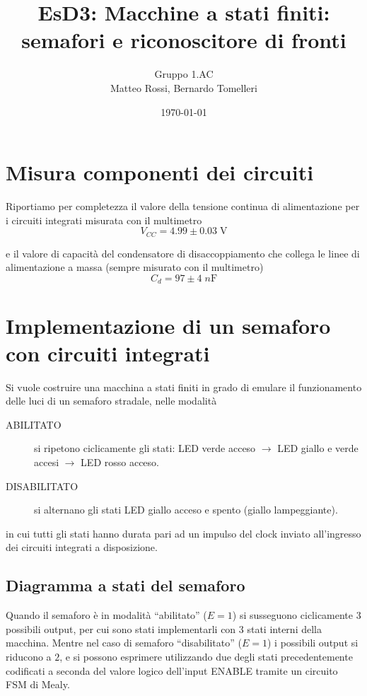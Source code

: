 \documentclass[10pt, a4paper, italian]{article}
\author{Gruppo 1.AC \\ Matteo Rossi, Bernardo Tomelleri}
\title{EsD3: Macchine a stati finiti: semafori e riconoscitore di fronti}
\begin{document}
\date{\today}
\maketitle

\section{Misura componenti dei circuiti}
Riportiamo per completezza il valore della tensione continua di
alimentazione per i circuiti integrati misurata con il multimetro
\[
V_{CC} = 4.99 \pm 0.03 \; \si{\V}
\]

e il valore di capacità del condensatore di disaccoppiamento che collega le
linee di alimentazione a massa (sempre misurato con il multimetro)
\[
C_d = 97 \pm 4 \; \si{n\F}
\]

\section{Implementazione di un semaforo con circuiti integrati}\label{sec: IC}
Si vuole costruire una macchina a stati finiti in grado di emulare il
funzionamento delle luci di un semaforo stradale, nelle modalità
\begin{description}
\item[ABILITATO] si ripetono ciclicamente gli stati: LED verde acceso $\to$
LED giallo e verde accesi $\to$ LED rosso acceso.
\item[DISABILITATO] si alternano gli stati LED giallo acceso e spento
(giallo lampeggiante).
\end{description}
in cui tutti gli stati hanno durata pari ad un impulso del clock inviato
all'ingresso dei circuiti integrati a disposizione.

\subsection{Diagramma a stati del semaforo}
Quando il semaforo è in modalità ``abilitato'' ($E=1$) si susseguono
ciclicamente 3 possibili output, per cui sono stati implementarli con $3$ stati
interni della macchina. Mentre nel caso di semaforo ``disabilitato'' ($E=1$) i
possibili output si riducono a $2$, e si possono esprimere utilizzando due
degli stati precedentemente codificati a seconda del valore logico dell'input
ENABLE tramite un circuito FSM di Mealy.
\end{document}
